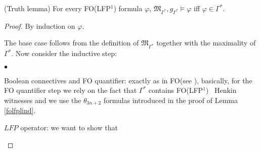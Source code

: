 \documentclass{LMCS}
\newcommand{\frM}{\mathfrak{M}}
\newcommand{\fo}{\textsf{FO}\xspace}
\newcommand{\folfp}{\textsf{FO(LFP$^1$)}\xspace}
\begin{document}
\begin{lem}(Truth lemma) For every \folfp formula $\varphi$, $\frM_{\Gamma^*}, g_{\Gamma^*} \models \varphi$ iff $\varphi \in \Gamma^*$.
\end{lem}
\begin{proof}
By induction on $\varphi$.

The base case follows from the definition of $\frM_{\Gamma^*}$ together with the maximality of $\Gamma^*$.
Now consider the inductive step:
\begin{iteMize}{$\bullet$}
\item   Boolean connectives and FO quantifier: exactly as in \fo (see
  \cite[page 138]{Enderton}), basically, for the \fo quantifier step we rely on the fact that $\Gamma^*$ contains \folfp~ Henkin witnesses and we use the $\theta_{3n+2}$ formulas introduced in the proof of Lemma \ref{folfplind}.
\item   $LFP$ operator: we want to show that
\begin{center}


\end{center}
\end{iteMize}
\end{proof}
\end{document}
